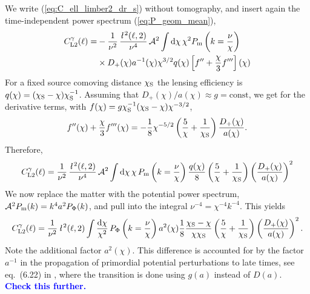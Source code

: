\documentclass[useAMS,usenatbib]{mn2e} %
\newcommand{\ellbar}{\hbox{\it \l}\,}
\newcommand{\pref}{{\cal A}}
\newcommand{\mk}[1]{{\bf\textcolor{blue}{#1}}}
\begin{document}
\begin{appendix}
We write (\ref{eq:C_ell_limber2_dr_s}) without tomography, and insert again the
time-independent power spectrum (\ref{eq:P_geom_mean}),
%
\begin{align}
  C^\gamma_{{\rm L2}}(\ell) = & - \frac 1 {\nu^2} \, \frac{\ellbar^2(\ell, 2)}{\nu^4} \, \pref^2
    \int {\rm d} \chi \, \chi^{2} P_{\rm m}\left(k = \frac\nu\chi\right)
    \nonumber \\
    & \times D_+(\chi) a^{-1}(\chi) \chi^{3/2} q(\chi) \left[ f^{\prime\prime} 
      + \frac{\chi}{3} f^{\prime\prime\prime} 
    \right](\chi)
  \label{eq:C_ell_limber2_dr_notomo}
\end{align}
%
For a fixed source comoving distance $\chi_{\rm S}$ the lensing efficiency is
$q(\chi) = (\chi_{\rm S} - \chi) \chi_{\rm S}^{-1}$. Assuming that
$D_+(\chi)/a(\chi) \approx g = \mbox{const}$, we get for the derivative terms,
with $f(\chi) = g \chi_{\rm S}^{-1} (\chi_{\rm S} - \chi) \chi^{-3/2}$,
%
\begin{equation}
  f^{\prime\prime}(\chi) + \frac{\chi}{3} f^{\prime\prime\prime}(\chi)
    = - \frac 1 8 \chi^{-5/2} \left( \frac 5 \chi
          + \frac 1 {\chi_{\rm S}} \right) \frac{D_+(\chi)}{a(\chi)}.
\end{equation}
%
Therefore,
%
\begin{align}
  C^\gamma_{{\rm L2}}(\ell) = \frac 1 {\nu^2} \, \frac{\ellbar^2(\ell, 2)}{\nu^4} \, \pref^2
    \int {\rm d} \chi \, \chi \, P_{\rm m}\left(k = \frac\nu\chi\right)
    \frac{q(\chi)}{8} \left( \frac 5 \chi + \frac 1 {\chi_{\rm S}} \right)
      \left(\frac{D_+(\chi)}{a(\chi)}\right)^2 
\end{align}
%
We now replace the matter with the potential power spectrum, ${\cal A}^2 P_{\rm m}(k) = k^{4} a^2 P_\Phi(k)$, and pull into the integral $\nu^{-4} = \chi^{-4} k^{-4}$. This yields
%
\begin{align}
  C^\gamma_{{\rm L2}}(\ell) = \frac 1 {\nu^2} \, \ellbar^2(\ell, 2)
    \int \frac{{\rm d} \chi}{\chi^2} \, P_\Phi\left(k = \frac\nu\chi\right)
    a^2(\chi) \frac{1}{8} \frac{\chi_{\rm S} - \chi}{\chi \chi_{\rm S}}
    \left( \frac 5 \chi + \frac 1 {\chi_{\rm S}} \right)
      \left(\frac{D_+(\chi)}{a(\chi)}\right)^2 .
\end{align}
%
Note the additional factor $a^2(\chi)$. This difference is accounted for by the
factor $a^{-1}$ in the propagation of primordial potential perturbations to
late times, see eq.~(6.22) in \cite{vande2012}, where the transition is done
using $g(a)$ instead of $D(a)$. \mk{Check this further.}



\end{appendix}
\end{document}
